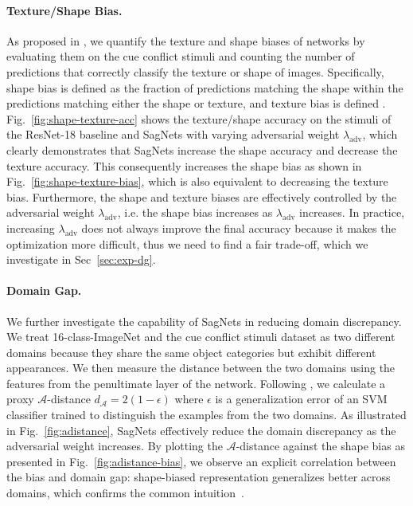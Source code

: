 \paragraph{\textnormal{\textbf{Texture/Shape Bias.}}}
As proposed in \cite{geirhos2019imagenet}, we quantify the texture and shape biases of networks by evaluating them on the cue conflict stimuli and counting the number of predictions that correctly classify the texture or shape of images.
Specifically, shape bias is defined as the fraction of predictions matching the shape within the predictions matching either the shape or texture, and texture bias is defined .
Fig.~\ref{fig:shape-texture-acc} shows the texture/shape accuracy on the stimuli of the ResNet-18 baseline and SagNets with varying adversarial weight $\lambda_\text{adv}$, which clearly demonstrates that SagNets increase the shape accuracy and decrease the texture accuracy.
This consequently increases the shape bias as shown in Fig.~\ref{fig:shape-texture-bias}, which is also equivalent to decreasing the texture bias.
Furthermore, the shape and texture biases are effectively controlled by the adversarial weight $\lambda_\text{adv}$, i.e. the shape bias increases as $\lambda_\text{adv}$ increases.
In practice, increasing $\lambda_\text{adv}$ does not always improve the final accuracy because it makes the optimization more difficult, thus we need to find a fair trade-off, which we investigate in Sec~\ref{sec:exp-dg}.


\paragraph{\textnormal{\textbf{Domain Gap.}}}
We further investigate the capability of SagNets in reducing domain discrepancy.
We treat 16-class-ImageNet and the cue conflict stimuli dataset as two different domains because they share the same object categories but exhibit different appearances.
We then measure the distance between the two domains using the features from the penultimate layer of the network.
Following \cite{mingsheng2015learning}, we calculate a proxy $\mathcal{A}$-distance $d_\mathcal{A} = 2(1 - \epsilon)$ where $\epsilon$ is a generalization error of an SVM classifier trained to distinguish the examples from the two domains.
As illustrated in Fig.~\ref{fig:adistance}, SagNets effectively reduce the domain discrepancy as the adversarial weight increases.
By plotting the $\mathcal{A}$-distance against the shape bias as presented in Fig.~\ref{fig:adistance-bias},
we observe an explicit correlation between the bias and domain gap: shape-biased representation generalizes better across domains, which confirms the common intuition~\cite{Hosseini2018AssessingSB,geirhos2019imagenet,Hermann2019ExploringTO}.



